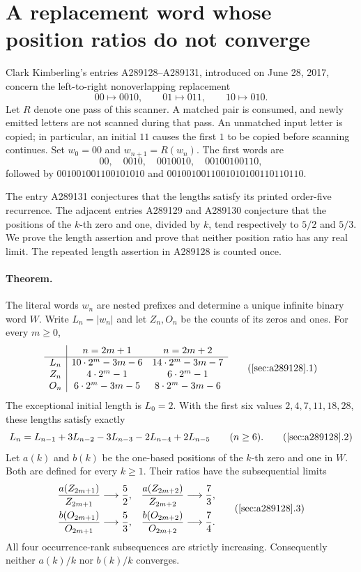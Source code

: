 \section{A replacement word whose position ratios do not converge}
\label{sec:a289128}

Clark Kimberling's entries A289128--A289131, introduced on June 28,
2017, concern the left-to-right nonoverlapping replacement
\[
00\longmapsto0010,\qquad01\longmapsto011,\qquad10\longmapsto010.
\]
Let $R$ denote one pass of this scanner. A matched pair is consumed,
and newly emitted letters are not scanned during that pass. An
unmatched input letter is copied; in particular, an initial $11$
causes the first $1$ to be copied before scanning continues. Set
$w_0=00$ and $w_{n+1}=R(w_n)$. The first words are
\[
00,\quad0010,\quad0010010,\quad00100100110,
\]
followed by $001001001100101010$ and
$0010010011001010100110110110$.

The entry A289131 conjectures that the lengths satisfy its printed
order-five recurrence. The adjacent entries A289129 and A289130
conjecture that the positions of the $k$-th zero and one, divided by
$k$, tend respectively to $5/2$ and $5/3$. We prove the length
assertion and prove that neither position ratio has any real limit.
The repeated length assertion in A289128 is counted once.

\paragraph{Theorem.}
The literal words $w_n$ are nested prefixes and determine a unique
infinite binary word $W$. Write $L_n=|w_n|$ and let $Z_n,O_n$ be the
counts of its zeros and ones. For every $m\ge0$,
\[
\begin{array}{c|cc}
 & n=2m+1 & n=2m+2\\ \hline
L_n & 10\cdot2^m-3m-6 & 14\cdot2^m-3m-7\\
Z_n & 4\cdot2^m-1 & 6\cdot2^m-1\\
O_n & 6\cdot2^m-3m-5 & 8\cdot2^m-3m-6
\end{array}
\tag{\ref{sec:a289128}.1}
\]
The exceptional initial length is $L_0=2$. With the first six values
$2,4,7,11,18,28$, these lengths satisfy exactly
\[
L_n=L_{n-1}+3L_{n-2}-3L_{n-3}-2L_{n-4}+2L_{n-5}
\qquad(n\ge6).
\tag{\ref{sec:a289128}.2}
\]
Let $a(k)$ and $b(k)$ be the one-based positions of the $k$-th zero
and one in $W$. Both are defined for every $k\ge1$. Their ratios have
the subsequential limits
\[
\begin{aligned}
\frac{a(Z_{2m+1})}{Z_{2m+1}}&\longrightarrow\frac52,
&\frac{a(Z_{2m+2})}{Z_{2m+2}}&\longrightarrow\frac73,\\
\frac{b(O_{2m+1})}{O_{2m+1}}&\longrightarrow\frac53,
&\frac{b(O_{2m+2})}{O_{2m+2}}&\longrightarrow\frac74.
\end{aligned}
\tag{\ref{sec:a289128}.3}
\]
All four occurrence-rank subsequences are strictly increasing.
Consequently neither $a(k)/k$ nor $b(k)/k$ converges.

